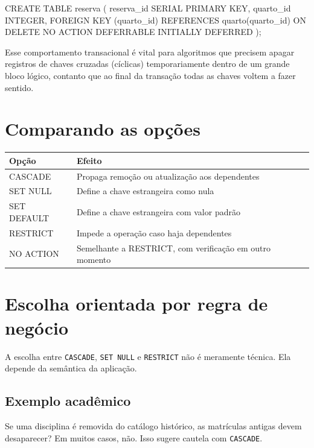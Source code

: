 \begin{sqlcode}
CREATE TABLE reserva (
    reserva_id SERIAL PRIMARY KEY,
    quarto_id INTEGER,
    FOREIGN KEY (quarto_id)
        REFERENCES quarto(quarto_id)
        ON DELETE NO ACTION DEFERRABLE INITIALLY DEFERRED
);
\end{sqlcode}

Esse comportamento transacional é vital para algoritmos que precisem apagar registros de chaves cruzadas (cíclicas) temporariamente dentro de um grande bloco lógico, contanto que ao final da transação todas as chaves voltem a fazer sentido.

\section{Comparando as opções}

\begin{center}
\begin{tabular}{|p{3cm}|p{8cm}|}
\hline
\textbf{Opção} & \textbf{Efeito} \\
\hline
CASCADE & Propaga remoção ou atualização aos dependentes \\
\hline
SET NULL & Define a chave estrangeira como nula \\
\hline
SET DEFAULT & Define a chave estrangeira com valor padrão \\
\hline
RESTRICT & Impede a operação caso haja dependentes \\
\hline
NO ACTION & Semelhante a RESTRICT, com verificação em outro momento \\
\hline
\end{tabular}
\end{center}

\section{Escolha orientada por regra de negócio}

A escolha entre \texttt{CASCADE}, \texttt{SET NULL} e \texttt{RESTRICT} não é meramente técnica. Ela depende da semântica da aplicação.

\subsection{Exemplo acadêmico}

Se uma disciplina é removida do catálogo histórico, as matrículas antigas devem desaparecer? Em muitos casos, não. Isso sugere cautela com \texttt{CASCADE}.

